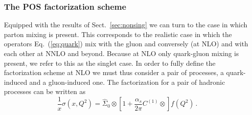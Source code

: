 \subsubsection{The POS factorization scheme}
\label{sec:pos}

Equipped with the results of Sect.~\ref{sec:nonsing} we can  turn to
the case in which parton mixing is present.   This corresponds to the
realistic case in which the operators Eq.~(\ref{eq:quark}) mix with
the gluon and conversely (at NLO) and with each other at NNLO and
beyond. Because at NLO only quark-gluon mixing is present, we refer to
this as the singlet case.
In order to fully define
the factorization scheme at NLO we must thus consider a pair of
processes, a quark-induced and a gluon-induced one.
The factorization for a pair of hadronic processes
can be written as 
\begin{equation}\label{eq:singhadfact}
 \frac{1}{x} \sigma(x,Q^2)= \hat \Sigma_0\otimes \left[1
 +\frac{\alpha_s}{2\pi}  C^{(1)} \otimes \right] f(Q^2) \,.
 \end{equation}
